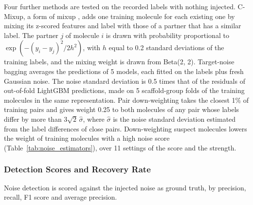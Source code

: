 Four further methods are tested on the recorded labels with nothing injected. C-Mixup, a form of mixup \citep{Zhang2018mixup}, adds one training molecule for each existing one by mixing its z-scored features and label with those of a partner that has a similar label. The partner $j$ of molecule $i$ is drawn with probability proportional to $\exp(-(y_i-y_j)^2/2h^2)$, with $h$ equal to 0.2 standard deviations of the training labels, and the mixing weight is drawn from Beta(2, 2). Target-noise bagging averages the predictions of 5 models, each fitted on the labels plus fresh Gaussian noise. The noise standard deviation is 0.5 times that of the residuals of out-of-fold LightGBM predictions, made on 5 scaffold-group folds of the training molecules in the same representation. Pair down-weighting takes the closest 1\% of training pairs and gives weight 0.25 to both molecules of any pair whose labels differ by more than $3\sqrt{2}\,\hat\sigma$, where $\hat\sigma$ is the noise standard deviation estimated from the label differences of close pairs. Down-weighting suspect molecules lowers the weight of training molecules with a high noise score (Table~\ref{tab:noise_estimators}), over 11 settings of the score and the strength.

\subsubsection{Detection Scores and Recovery Rate}

Noise detection is scored against the injected noise as ground truth, by precision, recall, F1 score and average precision.

